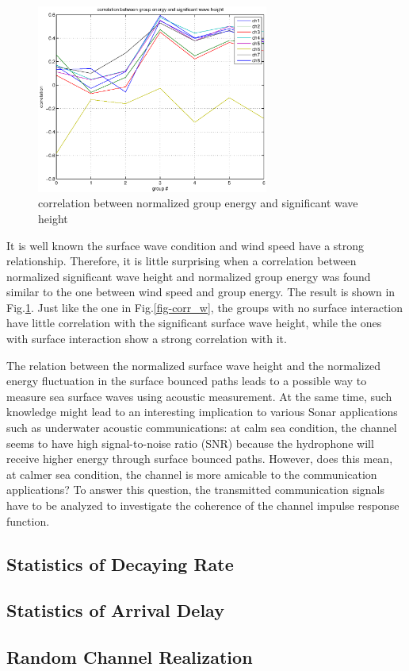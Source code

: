 \begin{figure}
\begin{center}
\includegraphics[width=3in]{correlation_energy_waveheight_1.eps}
\caption{\normalsize correlation between normalized group energy and
significant wave height }\label{fig-corr_h}
\end{center}
\end{figure}


It is well known the surface wave condition and wind speed have a
strong relationship. Therefore, it is little surprising when a
correlation between normalized significant wave height and
normalized group energy was found similar to the one between wind
speed and group energy. The result is shown in Fig.\ref{fig-corr_h}.
Just like the one in Fig.\ref{fig-corr_w}, the groups with no
surface interaction have little correlation with the significant
surface wave height, while the ones with surface interaction show a
strong correlation with it.

 The relation between
the normalized surface wave height and the normalized energy
fluctuation in the surface bounced paths leads to a possible way to
measure sea surface waves using acoustic measurement. At the same
time, such knowledge might lead to an interesting implication to
various Sonar applications such as underwater acoustic
communications: at calm sea condition, the channel seems to have
high signal-to-noise ratio (SNR) because the hydrophone will receive
higher energy through surface bounced paths. However, does this
mean, at calmer sea condition, the channel is more amicable to the
communication applications? To answer this question, the transmitted
communication signals have to be analyzed to investigate the
coherence of the channel impulse response function.


\subsection{Statistics of Decaying Rate}
\subsection{Statistics of Arrival Delay}



\subsection{Random Channel Realization}
